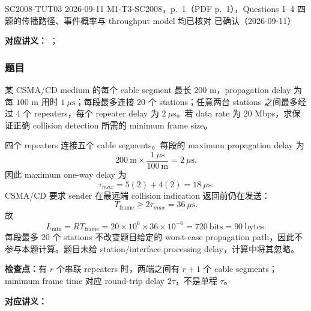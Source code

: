 
\label{tutorial:SC2008-TUT03}

\tutorialmeta
  {SC2008-TUT03}
  {2026-09-11}
  {M1-T3-SC2008，p.~1（PDF p.~1），Questions 1--4}
  {四题的传播路径、事件概率与 throughput model 均已核对}
  {已确认（2026-09-11）}


\textbf{对应讲义：}
；

\subsubsection*{题目}

某 CSMA/CD medium 的每个 cable segment 最长 $200$ m，propagation delay 为每 $100$ m 用时 $1\ \mu\mathrm{s}$；每段最多连接 $20$ 个 stations；任意两台 stations 之间最多经过 $4$ 个 repeaters，每个 repeater delay 为 $2\ \mu\mathrm{s}$。若 data rate 为 $20$ Mbps，求保证正确 collision detection 所需的 minimum frame size。

\begin{checkedsolution}
四个 repeaters 连接五个 cable segments。每段的 maximum propagation delay 为
\[
  200\ \mathrm{m}\times\frac{1\ \mu\mathrm{s}}{100\ \mathrm{m}}
  =2\ \mu\mathrm{s}.
\]
因此 maximum one-way delay 为
\[
  \tau_{max}=5(2)+4(2)=18\ \mu\mathrm{s}.
\]
CSMA/CD 要求 sender 在最远端 collision indication 返回前仍在发送：
\[
  T_{\mathrm{frame}}\ge2\tau_{max}=36\ \mu\mathrm{s}.
\]
故
\[
  L_{\min}=RT_{\mathrm{frame}}
  =20\times10^6\times36\times10^{-6}
  =\boxed{720\ \mathrm{bits}=90\ \mathrm{bytes}}.
\]
每段最多 $20$ 个 stations 不改变题目给定的 worst-case propagation path，因此不参与本题计算。题目未给 station/interface processing delay，计算中将其忽略。
\end{checkedsolution}

\textbf{检查点：}有 $r$ 个串联 repeaters 时，两端之间有 $r+1$ 个 cable segments；minimum frame time 对应 round-trip delay $2\tau$，不是单程 $\tau$。


\textbf{对应讲义：}

